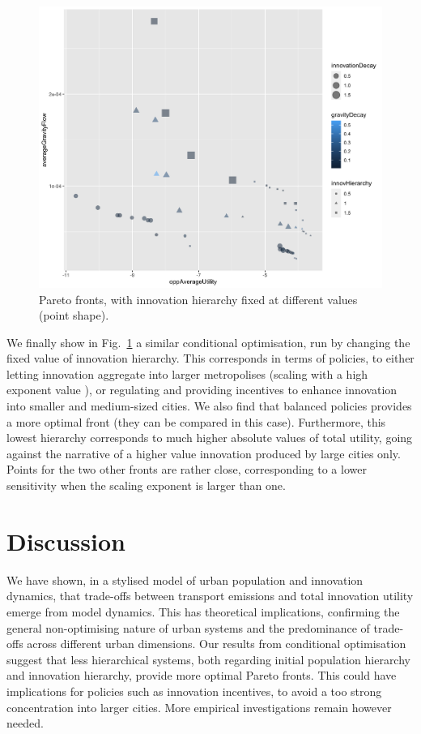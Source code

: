 \documentclass{article}
\begin{document}
\begin{figure}
	\centering
	\includegraphics[width=\linewidth]{figures/pareto-oppAverageUtility-averageGravityFlow_VARYINGINNOVHIERARCHY_color-gravityDecay_size-innovationDecay.png}
	\caption{Pareto fronts, with innovation hierarchy fixed at different values (point shape).\label{fig:fig3}}
\end{figure}

We finally show in Fig.~\ref{fig:fig3} a similar conditional optimisation, run by changing the fixed value of innovation hierarchy. This corresponds in terms of policies, to either letting innovation aggregate into larger metropolises (scaling with a high exponent value \cite{pumain2006evolutionary}), or regulating and providing incentives to enhance innovation into smaller and medium-sized cities. We also find that balanced policies provides a more optimal front (they can be compared in this case). Furthermore, this lowest hierarchy corresponds to much higher absolute values of total utility, going against the narrative of a higher value innovation produced by large cities only. Points for the two other fronts are rather close, corresponding to a lower sensitivity when the scaling exponent is larger than one.




\section{Discussion}

We have shown, in a stylised model of urban population and innovation dynamics, that trade-offs between transport emissions and total innovation utility emerge from model dynamics. This has theoretical implications, confirming the general non-optimising nature of urban systems and the predominance of trade-offs across different urban dimensions. Our results from conditional optimisation suggest that less hierarchical systems, both regarding initial population hierarchy and innovation hierarchy, provide more optimal Pareto fronts. This could have implications for policies such as innovation incentives, to avoid a too strong concentration into larger cities. More empirical investigations remain however needed.
\end{document}
